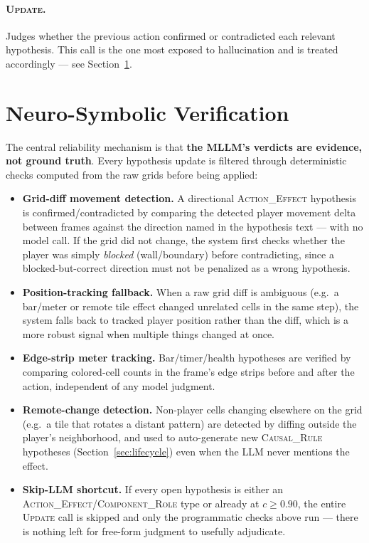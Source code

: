 \documentclass{article}
\begin{document}
\paragraph{\textsc{Update}.} Judges whether the previous action
confirmed or contradicted each relevant hypothesis. This call is the
one most exposed to hallucination and is treated accordingly — see
Section~\ref{sec:verification}.

\section{Neuro-Symbolic Verification}
\label{sec:verification}

The central reliability mechanism is that \textbf{the MLLM's verdicts
are evidence, not ground truth}. Every hypothesis update is filtered
through deterministic checks computed from the raw grids before being
applied:

\begin{itemize}[nosep]
\item \textbf{Grid-diff movement detection.} A directional
\textsc{Action\_Effect} hypothesis is confirmed/contradicted by
comparing the detected player movement delta between frames against the
direction named in the hypothesis text — with no model call. If the
grid did not change, the system first checks whether the player was
simply \emph{blocked} (wall/boundary) before contradicting, since a
blocked-but-correct direction must not be penalized as a wrong
hypothesis.
\item \textbf{Position-tracking fallback.} When a raw grid diff is
ambiguous (e.g.\ a bar/meter or remote tile effect changed unrelated
cells in the same step), the system falls back to tracked player
position rather than the diff, which is a more robust signal when
multiple things changed at once.
\item \textbf{Edge-strip meter tracking.} Bar/timer/health hypotheses
are verified by comparing colored-cell counts in the frame's edge
strips before and after the action, independent of any model judgment.
\item \textbf{Remote-change detection.} Non-player cells changing
elsewhere on the grid (e.g.\ a tile that rotates a distant pattern) are
detected by diffing outside the player's neighborhood, and used to
auto-generate new \textsc{Causal\_Rule} hypotheses (Section~\ref{sec:lifecycle}) even when the LLM never mentions the effect.
\item \textbf{Skip-LLM shortcut.} If every open hypothesis is either an
\textsc{Action\_Effect}/\textsc{Component\_Role} type or already at
$c \ge 0.90$, the entire \textsc{Update} call is skipped and only the
programmatic checks above run — there is nothing left for free-form
judgment to usefully adjudicate.
\end{itemize}
\end{document}
